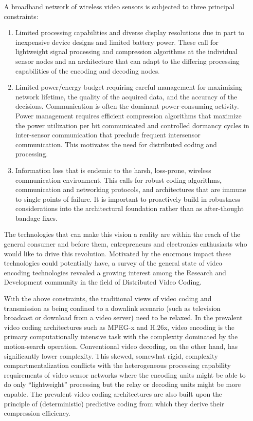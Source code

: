 \documentclass[letterpaper,12pt,titlepage,oneside,final]{report}
\begin{document}
        A broadband network of wireless video sensors is subjected to three principal constraints:
        \begin{enumerate}
            \item {Limited processing capabilities and diverse display resolutions due in part to inexpensive device designs and limited battery power. These call for lightweight signal processing and compression algorithms at the individual sensor nodes and an architecture that can adapt to the differing processing capabilities of the encoding and decoding nodes.}
            \item {Limited power/energy budget requiring careful management for maximizing network lifetime, the quality of the acquired data, and the accuracy of the decisions. Communication is often the dominant power-consuming activity. Power management requires efficient compression algorithms that maximize the power utilization per bit communicated and controlled dormancy cycles in inter-sensor communication that preclude frequent intersensor communication. This motivates the need for distributed coding and processing.}
            \item {Information loss that is endemic to the harsh, loss-prone, wireless communication environment. This calls for robust coding algorithms, communication and networking protocols, and architectures that are immune to single points of failure. It is important to proactively build in robustness considerations into the architectural foundation rather than as after-thought bandage fixes.}
        \end{enumerate}

        The technologies that can make this vision a reality are within the reach of the general consumer and before them, entrepreneurs and electronics enthusiasts who would like to drive this revolution. Motivated by the enormous impact these technologies could potentially have, a survey of the general state of video encoding technologies revealed a growing interest among the Research and Development community in the field of Distributed Video Coding. 

        With the above constraints, the traditional views of video coding and transmission as being confined to a downlink scenario (such as television broadcast or download from a video server) need to be relaxed. In the prevalent video coding architectures such as MPEG-x and H.26x, video encoding is the primary computationally intensive task with the complexity dominated by the motion-search operation. Conventional video decoding, on the other hand, has significantly lower complexity. This skewed, somewhat rigid, complexity compartmentalization conflicts with the heterogeneous processing capability requirements of video sensor networks where the encoding units might be able to do only “lightweight” processing but the relay or decoding units might be more capable. The prevalent video coding architectures are also built upon the principle of (deterministic) predictive coding from which they derive their compression efficiency. 
\end{document}
